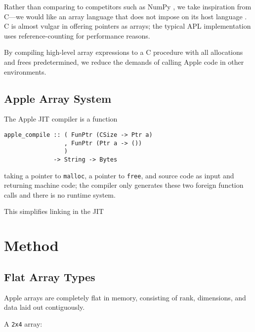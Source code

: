 \documentclass[sigplan,screen,anonymous]{acmart}
\begin{document}
Rather than comparing to competitors such as NumPy \cite{harris2020}, we take inspiration from C---we would like an array language that does not impose on its host language \cite{kell2017}.
C is almost vulgar in offering pointers as arrays; the typical APL implementation uses reference-counting \cite[p.~47]{hui2020} for performance reasons.

By compiling high-level array expressions to a C procedure with all allocations and frees predetermined, we reduce the demands of calling Apple code in other environments.


%

\subsection{Apple Array System}

The Apple JIT compiler is a function
\begin{verbatim}
apple_compile :: ( FunPtr (CSize -> Ptr a)
                 , FunPtr (Ptr a -> ())
                 ) 
              -> String -> Bytes
\end{verbatim}
taking a pointer to {\tt malloc}, a pointer to {\tt free}, and source code as input and returning machine code; the compiler only generates these two foreign function calls and there is no runtime system.

This simplifies linking in the JIT %


\section{Method}

\subsection{Flat Array Types}

Apple arrays are completely flat in memory, consisting of rank, dimensions, and data laid out contiguously.

A {\tt 2x4} array:
\end{document}
